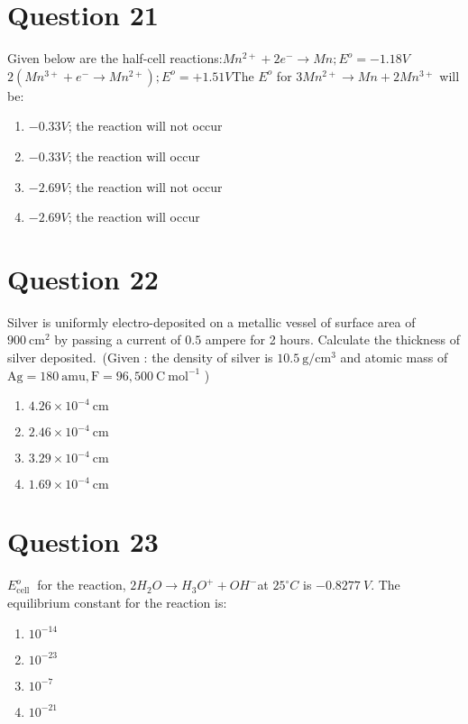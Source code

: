 \documentclass{article}
\begin{document}
\section*{Question 21}
Given below are the half-cell reactions:\(M n^{2+}+2 e^{-} \rightarrow M n ; E^o=-1.18 V\)\(2\left(M n^{3+}+e^{-} \rightarrow M n^{2+}\right) ; E^o=+1.51 V\)The \(E^o\) for \(3 Mn ^{2+} \rightarrow M n+2 M n^{3+}\) will be:
\begin{enumerate}[label=(\alph*)]
\item \(-0.33 V\); the reaction will not occur
\item \(-0.33 V\); the reaction will occur
\item \(-2.69 V\); the reaction will not occur
\item \(-2.69 V\); the reaction will occur
\end{enumerate}
\newpage
\section*{Question 22}
Silver is uniformly electro-deposited on a metallic vessel of surface area of \(900 \mathrm{~cm}^{2}\) by passing a current of \(0.5\) ampere for 2 hours. Calculate the thickness of silver deposited. (Given : the density of silver is \(10.5 \mathrm{~g} / \mathrm{cm}^{3}\) and atomic mass of \(\mathrm{Ag}=180 \mathrm{~amu}, \mathrm{F}= 96,500\mathrm{~C ~mol^{-1}}\) )
\begin{enumerate}[label=(\alph*)]
\item \(4.26 \times 10^{-4} \mathrm{~cm}\)\newline
\item \(2.46 \times 10^{-4} \mathrm{~cm}\)\newline
\item \(3.29 \times 10^{-4} \mathrm{~cm}\)\newline
\item \(1.69 \times 10^{-4} \mathrm{~cm}\)\newline
\end{enumerate}
\newpage
\section*{Question 23}
\(E_{\text {cell }}^{o}\) for the reaction, \(2 {H}_{2} {O} \rightarrow {H}_{3} {O}^{+}+{OH}^{-}\)at \(25^{\circ} {C}\) is \(-0.8277 {~V}\). The equilibrium constant for the reaction is:
\begin{enumerate}[label=(\alph*)]
\item \(10^{-14}\)
\item \(10^{-23}\)
\item \(10^{-7}\)
\item \(10^{-21}\)
\end{enumerate}
\newpage
\end{document}
